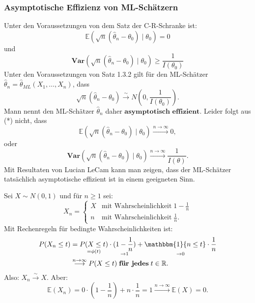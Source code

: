\documentclass[10pt]{article}
\newcommand{\FZV}{X_1, \ldots, X_n} %
\newcommand{\IR}{\mathbb{R}} %
\newcommand{\EW}{\mathbb{E}} %
\newcommand{\KV}{\overset{\sim} \longrightarrow} %
\newcommand{\eqname}[1]{\tag*{#1}}%
\newcommand{\Var}{\textbf{Var}} %
\newenvironment{BSP}[1][]
{\begin{Beispiel}[frametitle=#1]}{\end{Beispiel}}
\begin{document}
	\subsubsection{Asymptotische Effizienz von ML-Schätzern}
	
	Unter den Voraussetzungen von dem Satz der C-R-Schranke ist:
	\begin{equation*}
		\EW(\sqrt{n}(\hat{\theta}_n-\theta_0)\mid \theta_0) = 0
	\end{equation*}
	und 
	\begin{equation*}
		\Var(\sqrt{n}(\hat{\theta}_n-\theta_0)\mid \theta_0) \geq \frac{1}{I(\theta_0)}
	\end{equation*}
	Unter den Voraussetzungen von Satz 1.3.2 gilt für den ML-Schätzer $\hat{\theta}_n = \hat{\theta}_{ML}(\FZV)$, dass
	\begin{equation*}
		\sqrt{n}(\hat{\theta}_n-\theta_0) \KV N\left(0,\frac{1}{I(\theta_0)}\right). \eqname{(*)}
	\end{equation*}
	Mann nennt den ML-Schätzer $\hat{\theta}_n$ daher $\textbf{asymptotisch effizient}$.
	Leider folgt aus (*) nicht, dass
	\begin{equation*}
		\EW(\sqrt{n}(\hat{\theta}_n-\theta_0)\mid \theta_0) \overset{n\rightarrow \infty}{\longrightarrow} 0,
	\end{equation*}
	oder
	\begin{equation*}
		\Var(\sqrt{n}(\hat{\theta}_n-\theta_0)\mid \theta_0) \overset{n\rightarrow \infty}{\longrightarrow} \frac{1}{I(\theta)}.
	\end{equation*}
	Mit Resultaten von Lucian LeCam kann man zeigen, dass der ML-Schätzer tatsächlich asymptotische effizient ist in einem geeigneten Sinn. 
	
	\begin{BSP}[Beispiel 1.4.7 (Asymptotische Effizienz)]
		Sei $X \sim N(0,1)$ und für $n \geq 1$ sei:
		\begin{equation*}
			X_n =
			\begin{cases}
				X &\text{mit Wahrscheinlichkeit} \; 1-\frac{1}{n}\\
				n &\text{mit Wahrscheinlichkeit} \; \frac{1}{n}.
			\end{cases}
		\end{equation*}
		Mit Rechenregeln für bedingte Wahrscheinlichkeiten ist:
		\begin{equation*}
			\begin{split}
				P(X_n \leq t) &= \underset{= \phi(t)}{P(X \leq t)} \cdot ( \underset{\rightarrow 1}{1-\frac{1}{n}} ) + \underset{\rightarrow 0}{\mathbbm{1} \{n \leq t\} \cdot \frac{1}{n}}\\
				&\overset{n \rightarrow \infty}{\longrightarrow} P(X \leq t) \; \textbf{für jedes} \; t \in \IR.
			\end{split}
		\end{equation*}
		Also: $X_n \KV X$. 
		Aber:
		\begin{equation*}
			\EW(X_n) = 0 \cdot \left(1- \frac{1}{n}\right) + n \cdot \frac{1}{n} = 1 \overset{n \rightarrow \infty}{\longrightarrow} \EW(X) = 0.
		\end{equation*}
	\end{BSP}
\end{document}
